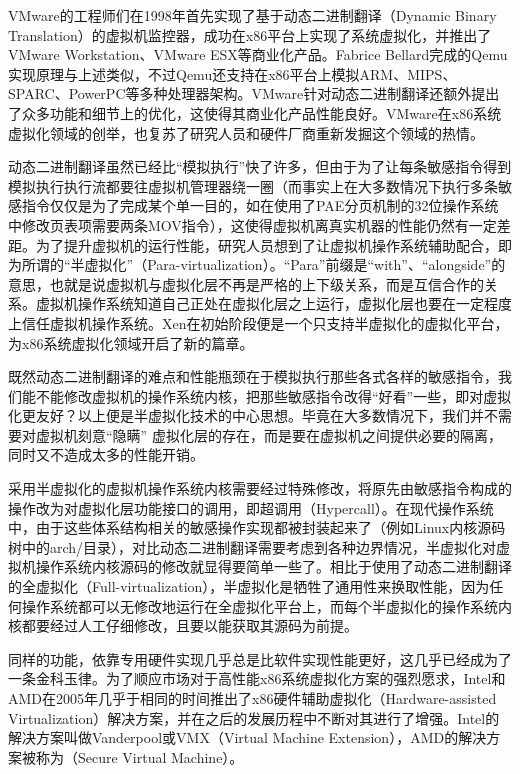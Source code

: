 VMware的工程师们在1998年首先实现了基于动态二进制翻译（Dynamic Binary Translation）的虚拟机监控器，成功在x86平台上实现了系统虚拟化，并推出了VMware Workstation、VMware ESX等商业化产品。Fabrice Bellard完成的Qemu实现原理与上述类似，不过Qemu还支持在x86平台上模拟ARM、MIPS、SPARC、PowerPC等多种处理器架构。VMware针对动态二进制翻译还额外提出了众多功能和细节上的优化，这使得其商业化产品性能良好。VMware在x86系统虚拟化领域的创举，也复苏了研究人员和硬件厂商重新发掘这个领域的热情。

动态二进制翻译虽然已经比``模拟执行''快了许多，但由于为了让每条敏感指令得到模拟执行执行流都要往虚拟机管理器绕一圈（而事实上在大多数情况下执行多条敏感指令仅仅是为了完成某个单一目的，如在使用了PAE分页机制的32位操作系统中修改页表项需要两条MOV指令），这使得虚拟机离真实机器的性能仍然有一定差距。为了提升虚拟机的运行性能，研究人员想到了让虚拟机操作系统辅助配合，即为所谓的``半虚拟化''（Para-virtualization）。``Para''前缀是``with''、``alongside''的意思，也就是说虚拟机与虚拟化层不再是严格的上下级关系，而是互信合作的关系。虚拟机操作系统知道自己正处在虚拟化层之上运行，虚拟化层也要在一定程度上信任虚拟机操作系统。Xen在初始阶段便是一个只支持半虚拟化的虚拟化平台，为x86系统虚拟化领域开启了新的篇章。

既然动态二进制翻译的难点和性能瓶颈在于模拟执行那些各式各样的敏感指令，我们能不能修改虚拟机的操作系统内核，把那些敏感指令改得``好看''一些，即对虚拟化更友好？以上便是半虚拟化技术的中心思想。毕竟在大多数情况下，我们并不需要对虚拟机刻意``隐瞒'' 虚拟化层的存在，而是要在虚拟机之间提供必要的隔离，同时又不造成太多的性能开销。

采用半虚拟化的虚拟机操作系统内核需要经过特殊修改，将原先由敏感指令构成的操作改为对虚拟化层功能接口的调用，即超调用（Hypercall）。在现代操作系统中，由于这些体系结构相关的敏感操作实现都被封装起来了（例如Linux内核源码树中的arch/目录），对比动态二进制翻译需要考虑到各种边界情况，半虚拟化对虚拟机操作系统内核源码的修改就显得要简单一些了。相比于使用了动态二进制翻译的全虚拟化（Full-virtualization），半虚拟化是牺牲了通用性来换取性能，因为任何操作系统都可以无修改地运行在全虚拟化平台上，而每个半虚拟化的操作系统内核都要经过人工仔细修改，且要以能获取其源码为前提。

同样的功能，依靠专用硬件实现几乎总是比软件实现性能更好，这几乎已经成为了一条金科玉律。为了顺应市场对于高性能x86系统虚拟化方案的强烈愿求，Intel和AMD在2005年几乎于相同的时间推出了x86硬件辅助虚拟化（Hardware-assisted Virtualization）解决方案，并在之后的发展历程中不断对其进行了增强。Intel的解决方案叫做Vanderpool或VMX（Virtual Machine Extension），AMD的解决方案被称为（Secure Virtual Machine）。

